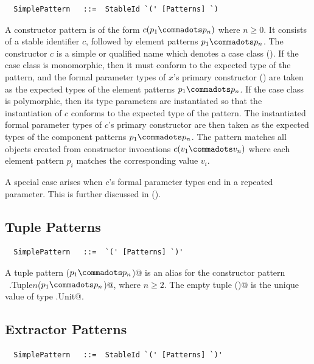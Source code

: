 \syntax\begin{lstlisting}
  SimplePattern   ::=  StableId `(' [Patterns] `)
\end{lstlisting}

A constructor pattern is of the form $c(p_1 \commadots p_n)$ where $n
\geq 0$. It consists of a stable identifier $c$, followed by element
patterns $p_1 \commadots p_n$. The constructor $c$ is a simple or
qualified name which denotes a case class
(). If the case class is monomorphic, then it
must conform to the expected type of the pattern, and the formal
parameter types of $x$'s primary constructor ()
are taken as the expected types of the element patterns $p_1\commadots
p_n$.  If the case class is polymorphic, then its type parameters are
instantiated so that the instantiation of $c$ conforms to the expected
type of the pattern. The instantiated formal parameter types of $c$'s
primary constructor are then taken as the expected types of the
component patterns $p_1\commadots p_n$.  The pattern matches all
objects created from constructor invocations $c(v_1 \commadots v_n)$
where each element pattern $p_i$ matches the corresponding value
$v_i$.

A special case arises when $c$'s formal parameter types end in a
repeated parameter. This is further discussed in
().

\subsection{Tuple Patterns}

\syntax\begin{lstlisting}
  SimplePattern   ::=  `(' [Patterns] `)'
\end{lstlisting}

A tuple pattern \lstinline@($p_1 \commadots p_n$)@ is an alias
for the constructor pattern ~\lstinline@scala.Tuple$n$($p_1 \commadots
p_n$)@, where $n \geq 2$. The empty tuple
\lstinline@()@ is the unique value of type \lstinline@scala.Unit@.

\subsection{Extractor Patterns}\label{sec:extractor-patterns}

\syntax\begin{lstlisting}
  SimplePattern   ::=  StableId `(' [Patterns] `)'
\end{lstlisting}


